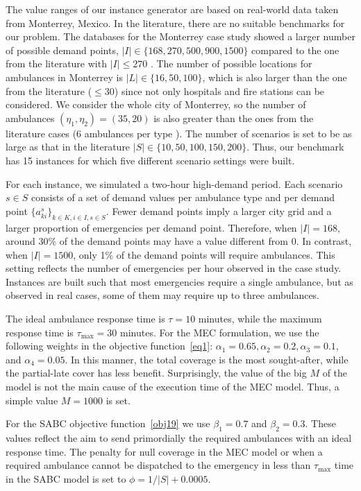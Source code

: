 The value ranges of our instance generator are based on real-world data taken from Monterrey, Mexico. In the literature, there are no suitable benchmarks for our problem. The databases for the Monterrey case study showed a larger number of possible demand points, $|I|\in \{168, 270, 500, 900, 1500\}$ compared to the one from the literature with $|I| \leq 270$ \citep{yoon2021stochastic}. The number of possible locations for ambulances in Monterrey is $|L|\in \{16,50,100\}$,  which is also larger than the one from the literature ($\leq$30) since not only hospitals and fire stations can be considered. We consider the whole city of Monterrey, so the number of ambulances $(\eta_1,\eta_2)= (35,20)$ is also greater than the ones from the literature cases (6 ambulances per type \citep{yoon2021stochastic}).
The number of scenarios is set to be as large as that in the literature $|S| \in \{10,50,100, 150, 200\}$. Thus, our benchmark has 15 instances for which five different scenario settings were built.
 
For each instance, we simulated a two-hour high-demand period. Each scenario $s\in S$ consists of a set of demand values per ambulance type and per demand point $\{a^s_{ki}\}_{k\in K, i\in I,s\in S}$.  
Fewer demand points imply a larger city grid and a larger proportion of emergencies per demand point. Therefore, when $|I|=168$, around 30\% of the demand points may have a value different from 0. In contrast, when $|I|=1500$, only 1\% of the demand points will require ambulances. This setting reflects the number of emergencies per hour observed in the case study. Instances are built such that most emergencies require a single ambulance, but as observed in real cases, some of them may require up to three ambulances. 
 
The ideal ambulance response time is $\tau = 10$ minutes, while the maximum response time is $\tau_{\max}=30$ minutes. For the MEC formulation, we use the following weights in the objective function~\eqref{eq1}: $\alpha_1= 0.65, \alpha_2= 0.2, \alpha_3= 0.1$, and $\alpha_4= 0.05$. In this manner, the total coverage is the most sought-after, while the partial-late cover has less benefit. Surprisingly, the value of the big $M$ of the model is not the main cause of the execution time of the MEC model. Thus, a simple value $M=1000$ is set. 

For the SABC objective function~\eqref{obj19} we use $\beta_1 = 0.7$ and $\beta_2 = 0.3$. These values reflect the aim to send primordially the required ambulances with an ideal response time. The penalty for null coverage in the MEC model or when a required ambulance cannot be dispatched to the emergency in less than $\tau_{\max}$ time in the SABC model is set to $\phi =   1/ |S|  + 0.0005$. 

